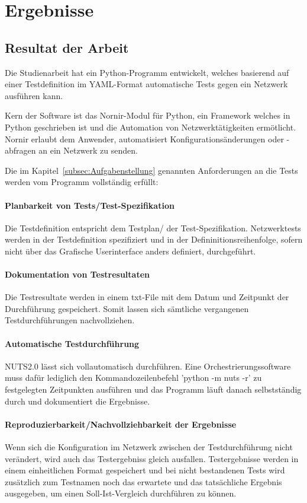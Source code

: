 \documentclass[]{subfiles}
\begin{document}
\section{Ergebnisse}
\subsection{Resultat der Arbeit}
Die Studienarbeit hat ein Python-Programm entwickelt, welches basierend auf einer Testdefinition
im YAML-Format automatische Tests gegen ein Netzwerk ausführen kann.

Kern der Software ist das Nornir-Modul für Python, ein Framework welches in Python geschrieben
ist und die Automation von Netzwerktätigkeiten ermötlicht. 
Nornir erlaubt dem Anwender, automatisiert Konfigurationsänderungen oder -abfragen an ein 
Netzwerk zu senden.

Die im Kapitel~\ref{subsec:Aufgabenstellung} genannten Anforderungen an die Tests werden 
vom Programm vollständig erfüllt:

\paragraph{Planbarkeit von Tests/Test-Spezifikation} 
Die Testdefinition entspricht dem Testplan/ der Test-Spezifikation.
Netzwerktests werden in der Testdefinition spezifiziert und in der Defininitionsreihenfolge,
sofern nicht über das Grafische Userinterface anders definiert, durchgeführt.

\paragraph{Dokumentation von Testresultaten} 
Die Testresultate werden in einem txt-File mit dem Datum und Zeitpunkt der Durchführung 
gespeichert. 
Somit lassen sich sämtliche vergangenen Testdurchführungen nachvollziehen.

\paragraph{Automatische Testdurchführung} 
NUTS2.0 lässt sich vollautomatisch durchführen.
Eine Orchestrierungssoftware muss dafür lediglich den Kommandozeilenbefehl
'python -m nuts -r' zu festgelegten Zeitpunkten ausführen und das 
Programm läuft danach selbstständig durch und dokumentiert die Ergebnisse.

\paragraph{Reproduzierbarkeit/Nachvollziehbarkeit der Ergebnisse} 
Wenn sich die Konfiguration im Netzwerk zwischen der Testdurchführung nicht verändert,
wird auch das Testergebniss gleich ausfallen. 
Testergebnisse werden in einem einheitlichen Format gespeichert und bei nicht bestandenen
Tests wird zusätzlich zum Testnamen noch das erwartete und das tatsächliche Ergebnis
ausgegeben, um einen Soll-Ist-Vergleich durchführen zu können.
\end{document}
